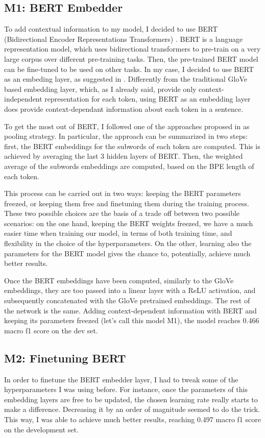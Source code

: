 \documentclass[11pt,a4paper]{article}
\begin{document}
	\subsection{M1: BERT Embedder}
	To add contextual information to my model, I decided to use BERT (Bidirectional Encoder Representations Transformers) \citep{devlin2018bert}. BERT is a language representation model, which uses bidirectional transformers to pre-train on a very large corpus over different pre-training tasks. Then, the pre-trained BERT model can be fine-tuned to be used on other tasks. In my case, I decided to use BERT as an embeding layer, as suggested in \citep{li2019exploiting}. Differently from the traditional GloVe based embedding layer, which, as I already said, provide only context-independent representation for each token, using BERT as an embedding layer does provide context-dependant information about each token in a sentence.
	
	To get the most out of BERT, I followed one of the approaches proposed in \citep{acs2021subword} as pooling strategy. In particular, the approach can be summarized in two steps: first, the BERT embeddings for the subwords of each token are computed. This is achieved by averaging the last 3 hidden layers of BERT. Then, the weighted average of the subwords embeddings are computed, based on the BPE length of each token.
	
	This process can be carried out in two ways: keeping the BERT parameters freezed, or keeping them free and finetuning them during the training process. These two possible choices are the basis of a trade off between two possible scenarios: on the one hand, keeping the BERT weights freezed, we have a much easier time when training our model, in terms of both training time, and flexibility in the choice of the hyperparameters. On the other, learning also the parameters for the BERT model gives the chance to, potentially, achieve much better results.
	
	Once the BERT embeddings have been computed, similarly to the GloVe embeddings, they are too passed into a linear layer with a ReLU activation, and subsequently concatenated with the GloVe pretrained embeddings. The rest of the network is the same. Adding context-dependent information with BERT and keeping its parameters freezed (let's call this model M1), the model reaches 0.466 macro f1 score on the dev set.
	
	\subsection{M2: Finetuning BERT}
	In order to finetune the BERT embedder layer, I had to tweak some of the hyperparameters I was using before. For instance, once the parameters of this embedding layers are free to be updated, the chosen learning rate really starts to make a difference. Decreasing it by an order of magnitude seemed to do the trick. This way, I was able to achieve much better results, reaching 0.497 macro f1 score on the development set.
	
\end{document}
